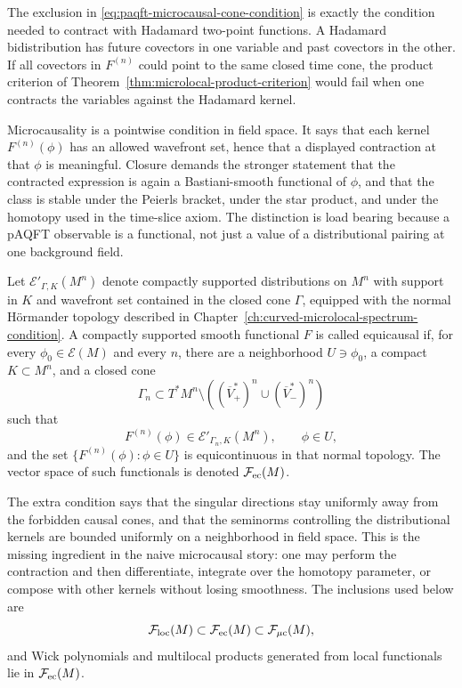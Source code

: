The exclusion in \eqref{eq:paqft-microcausal-cone-condition} is exactly the
condition needed to contract with Hadamard two-point functions.  A Hadamard
bidistribution has future covectors in one variable and past covectors in the
other.  If all covectors in \(F^{(n)}\) could point to the same closed time
cone, the product criterion of
Theorem~\ref{thm:microlocal-product-criterion} would fail when one contracts
the variables against the Hadamard kernel.

Microcausality is a pointwise condition in field space.  It says that each
kernel \(F^{(n)}(\phi)\) has an allowed wavefront set, hence that a displayed
contraction at that \(\phi\) is meaningful.  Closure demands the stronger
statement that the contracted expression is again a Bastiani-smooth
functional of \(\phi\), and that the class is stable under the Peierls
bracket, under the star product, and under the homotopy used in the time-slice
axiom.  The distinction is load bearing because a pAQFT observable is a
functional, not just a value of a distributional pairing at one background
field.

Let \(\mathcal E'_{\Gamma,K}(M^n)\) denote compactly supported
distributions on \(M^n\) with support in \(K\) and wavefront set contained in
the closed cone \(\Gamma\), equipped with the normal
H\"ormander topology described in
Chapter~\ref{ch:curved-microlocal-spectrum-condition}.  A compactly
supported smooth functional \(F\) is called equicausal if, for every
\(\phi_0\in\mathcal E(M)\) and every \(n\), there are a neighborhood
\(U\ni\phi_0\), a compact \(K\subset M^n\), and a closed cone
\[
  \Gamma_n
  \subset
  T^*M^n\setminus
  \left((\overline V_+^*)^n\cup(\overline V_-^*)^n\right)
\]
such that
\[
  F^{(n)}(\phi)\in\mathcal E'_{\Gamma_n,K}(M^n),
  \qquad \phi\in U,
\]
and the set
\(\{F^{(n)}(\phi):\phi\in U\}\) is equicontinuous in that normal topology.
The vector space of such functionals is denoted
\(\mathcal F_{\rm ec}(M)\).

The extra condition says that the singular directions stay uniformly away
from the forbidden causal cones, and that the seminorms controlling the
distributional kernels are bounded uniformly on a neighborhood in field
space.  This is the missing ingredient in the naive microcausal story:
one may perform the contraction and then differentiate, integrate over the
homotopy parameter, or compose with other kernels without losing smoothness.
The inclusions used below are
\[
  \mathcal F_{\rm loc}(M)
  \subset
  \mathcal F_{\rm ec}(M)
  \subset
  \mathcal F_{\mu{\rm c}}(M),
\]
and Wick polynomials and multilocal products generated from local
functionals lie in \(\mathcal F_{\rm ec}(M)\).


